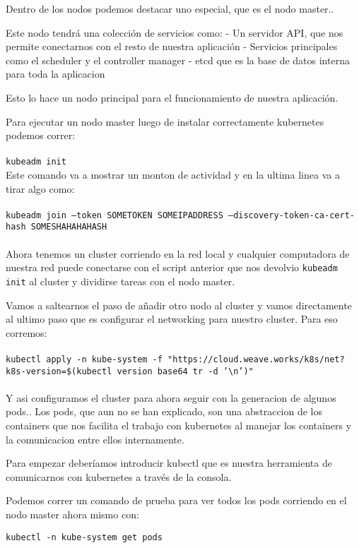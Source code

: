 \documentclass[11pt]{article} %
\begin{document}
Dentro de los nodos podemos destacar uno especial, que es el nodo master..

Este nodo tendrá una colección de servicios como:
    - Un servidor API, que nos permite conectarnos con el resto de nuestra aplicación
    - Servicios principales como el scheduler y el controller manager
    - etcd que es la base de datos interna para toda la aplicacion

Esto lo hace un nodo principal para el funcionamiento de nuestra aplicación.

Para ejecutar un nodo master luego de instalar correctamente kubernetes podemos correr:\\ \\
    \texttt{kubeadm init} \\

Este comando va a mostrar un monton de actividad y en la ultima linea va a tirar algo como:\\ \\

    \texttt{kubeadm join --token SOMETOKEN SOMEIPADDRESS --discovery-token-ca-cert-hash SOMESHAHAHAHASH} \\ \\

Ahora tenemos un cluster corriendo en la red local y cualquier computadora de nuestra red puede conectarse con el script anterior que nos devolvio \texttt{kubeadm init} al cluster y dividirse tareas con el nodo master.

Vamos a saltearnos el paso de añadir otro nodo al cluster y vamos directamente al ultimo paso que es configurar el networking para nuestro cluster. Para eso corremos:\\ \\
    \texttt{kubectl apply -n kube-system -f "https://cloud.weave.works/k8s/net?k8s-version=\$(kubectl version \textbar base64 \textbar  tr -d '\textbackslash n')"} \\ \\

Y asi configuramos el cluster para ahora seguir con la generacion de algunos pods.. Los pods, que aun no se han explicado, son una abstraccion de los containers que nos facilita el trabajo con kubernetes al manejar los containers y la comunicacion entre ellos internamente. 

Para empezar deberíamos introducir kubectl que es nuestra herramienta de comunicarnos con kubernetes a través de la consola.

Podemos correr un comando de prueba para ver todos los pods corriendo en el nodo master ahora mismo con:
\begin{center}
    \texttt{kubectl -n kube-system get pods}
\end{center}
\end{document}
